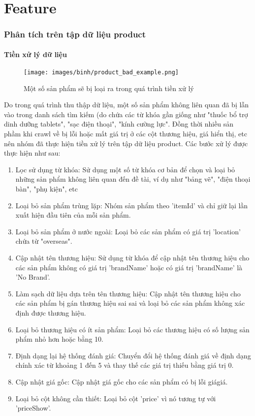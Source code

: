 \part{Feature}

\section{Phân tích trên tập dữ liệu product}
\subsection{Tiền xử lý dữ liệu}
\begin{figure}
    \centering
    \texttt{[image: images/binh/product\_bad\_example.png]}
    \caption{Một số sản phẩm sẽ bị loại ra trong quá trình tiền xử lý}
    \label{fig:enter-label}
\end{figure}
Do trong quá trình thu thập dữ liệu, một số sản phẩm không liên quan đã bị lẫn vào trong danh sách tìm kiếm (do chứa các từ khóa gần giống như "thuốc bổ trợ dinh dưỡng tablets", "sạc điện thoại", "kính cường lực". Đồng thời nhiều sản phầm khi crawl về bị lỗi hoặc mất giá trị ở các cột thương hiệu, giá hiển thị, etc nên nhóm đã thực hiện tiền xử lý trên tập dữ liệu product. Các bước xử lý được thực hiện như sau:

\begin{enumerate}
    \item Lọc sử dụng từ khóa: Sử dụng một số từ khóa cơ bản để chọn và loại bỏ những sản phẩm không liên quan đến đề tài, ví dụ như "bảng vẽ", "điện thoại bàn", "phụ kiện", etc
    \item Loại bỏ sản phẩm trùng lặp: Nhóm sản phẩm theo 'itemId' và chỉ giữ lại lần xuất hiện đầu tiên của mỗi sản phẩm.
    \item Loại bỏ sản phẩm ở nước ngoài: Loại bỏ các sản phẩm có giá trị 'location' chứa từ "overseas".
    \item Cập nhật tên thương hiệu: Sử dụng từ khóa để cập nhật tên thương hiệu cho các sản phẩm không có giá trị 'brandName' hoặc có giá trị 'brandName' là 'No Brand'.
    \item Làm sạch dữ liệu dựa trên tên thương hiệu: Cập nhật tên thương hiệu cho các sản phẩm bị gán thương hiệu sai sai và loại bỏ các sản phẩm không xác định được thương hiệu.
    \item Loại bỏ thương hiệu có ít sản phẩm: Loại bỏ các thương hiệu có số lượng sản phẩm nhỏ hơn hoặc bằng 10.
    \item Định dạng lại hệ thống đánh giá: Chuyển đổi hệ thống đánh giá về định dạng chính xác từ khoảng 1 đến 5 và thay thế các giá trị thiếu bằng giá trị 0.
    \item Cập nhật giá gốc: Cập nhật giá gốc cho các sản phẩm có bị lỗi giágiá.
    \item Loại bỏ cột không cần thiết: Loại bỏ cột 'price' vì nó tương tự với 'priceShow'.
\end{enumerate}

